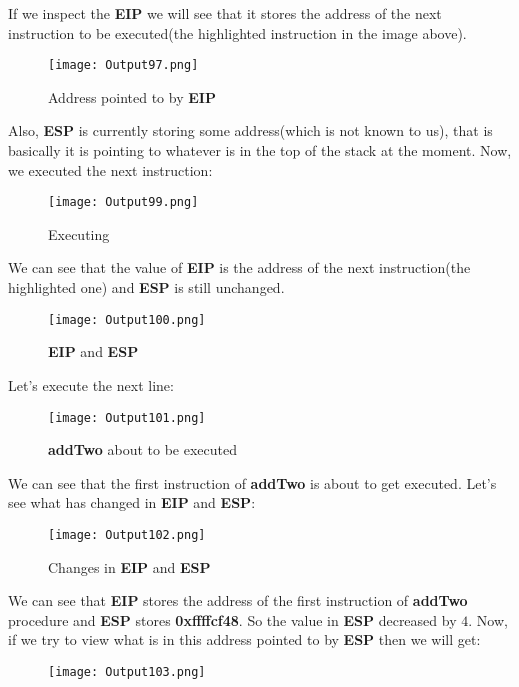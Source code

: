 \documentclass{article}
\begin{document}
If we inspect the \textbf{EIP} we will see that it stores the address of the next instruction to be executed(the highlighted instruction in the image above).
\begin{figure}[h]
	\centering
	\texttt{[image: Output97.png]}
	\caption{Address pointed to by \textbf{EIP}}
	\label{fig:fig2}
\end{figure}

Also, \textbf{ESP} is currently storing some address(which is not known to us), that is basically it is pointing to whatever is in the top of the stack at the moment.
\newpage
Now, we executed the next instruction:
\begin{figure}[h]
	\centering
	\texttt{[image: Output99.png]}
	\caption{Executing}
	\label{fig:fig3}
\end{figure}

We can see that the value of \textbf{EIP} is the address of the next instruction(the highlighted one) and \textbf{ESP} is still unchanged.
\begin{figure}[h]
	\centering
	\texttt{[image: Output100.png]}
	\caption{\textbf{EIP} and \textbf{ESP}}
	\label{fig:fig4}
\end{figure}

\newpage
Let's execute the next line:
\begin{figure}[h]
	\centering
	\texttt{[image: Output101.png]}
	\caption{\textbf{addTwo} about to be executed}
	\label{fig:fig5}
\end{figure}

We can see that the first instruction of \textbf{addTwo} is about to get executed. Let's see what has changed in \textbf{EIP} and \textbf{ESP}:
\begin{figure}[h]
	\centering
	\texttt{[image: Output102.png]}
	\caption{Changes in \textbf{EIP} and \textbf{ESP}}
	\label{fig:fig6}
\end{figure}

We can see that \textbf{EIP} stores the address of the first instruction of \textbf{addTwo} procedure and \textbf{ESP} stores \textbf{0xffffcf48}. So the value in \textbf{ESP} decreased by $4$.
\newpage
Now, if we try to view what is in this address pointed to by \textbf{ESP} then we will get:
\begin{figure}[h]
	\texttt{[image: Output103.png]}
	\centering
	\label{fig:fig7}
\end{figure}
\end{document}
